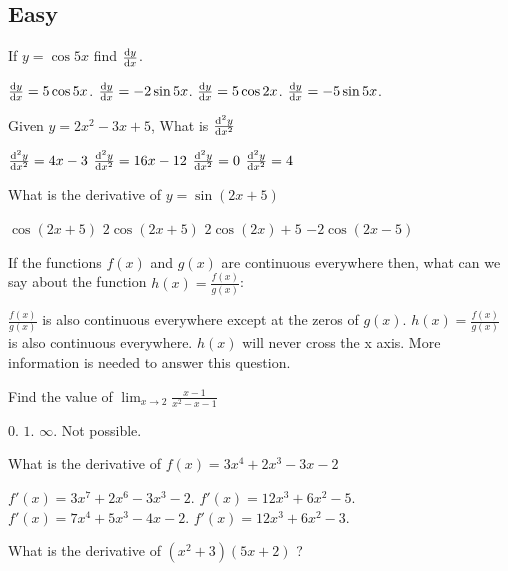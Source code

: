 \documentclass{exam}
\begin{document}
\begin{questions}

\section{Easy}
	\question If $y=\cos5x$ find $\dv{y}{x}$.

	\begin{choices}
		\choice $\dv{y}{x} = 5\cos5x$.
		\choice $\dv{y}{x} = -2\sin5x$.
		\choice $\dv{y}{x} = 5\cos2x$.
		\CorrectChoice $\dv{y}{x} = -5\sin5x$.
	\end{choices}
	\question Given $y=2x^2-3x+5$, What is $\dv[2]{y}{x}$

	\begin{choices}
		\choice $\dv[2]{y}{x}=4x-3$
		\choice $\dv[2]{y}{x}=16x-12$
		\choice $\dv[2]{y}{x}=0$
		\CorrectChoice $\dv[2]{y}{x}=4$
	\end{choices}
	\question What is the derivative of $y=\sin (2x + 5)$

	\begin{choices}
		\choice $ \cos(2x+5)$
		\CorrectChoice $ 2\cos(2x+5)$
		\choice $ 2\cos(2x)+5$
		\choice $ -2\cos(2x-5)$
	\end{choices}


	\question If the functions $f(x)$ and $g(x)$ are continuous everywhere then, what can we say about the function $h(x) = \frac{f(x)}{g(x)}$:

	\begin{choices}
		\CorrectChoice $\frac{f(x)}{g(x)}$ is also continuous everywhere except at the zeros of $g(x)$.
		\choice $h(x) = \frac{f(x)}{g(x)}$ is also continuous everywhere.
		\choice $h(x)$ will never cross the x axis.
		\choice More information is needed to answer this question.
	\end{choices}


	\question Find the value of $\lim_{x\to 2}\frac{x-1}{x^2-x-1}$

	\begin{choices}
		\choice $0$.
		\CorrectChoice $1$.
		\choice $\infty$.
		\choice Not possible.
	\end{choices}

	\question What is the derivative of $f(x)= 3x^4+2x^3-3x-2$
	\begin{choices}
		\choice $f'(x)= 3x^7+2x^6-3x^3-2$.
		\choice $f'(x)= 12x^3+6x^2-5$.
		\choice $f'(x)= 7x^4+5x^3-4x-2$.
		\CorrectChoice $f'(x)= 12x^3+6x^2-3$.
	\end{choices}
	\question What is the derivative of $(x^{2} + 3)(5 x + 2)$ ?


\end{questions}
\end{document}
